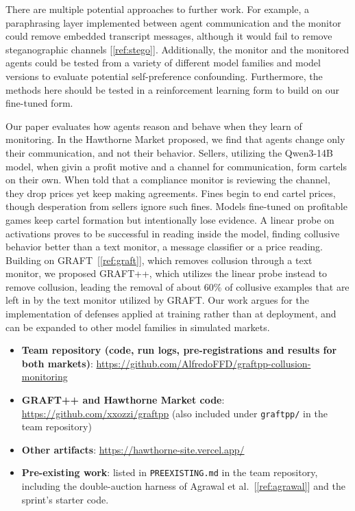 \documentclass[11pt,letterpaper]{article}
\newcommand{\gap}{\par\vspace{\baselineskip}}   %
\newcommand{\head}[1]{\par\vspace{26pt}{\noindent\fontsize{14}{17}\selectfont\bfseries\color[HTML]{434343}#1\par}\nopagebreak\vspace{6pt}\nopagebreak}
\newcommand{\subhead}[1]{\par\vspace{26pt}{\noindent\fontsize{13}{16}\selectfont\bfseries\color[HTML]{666666}#1\par}\nopagebreak\vspace{4pt}\nopagebreak}
\newenvironment{instr}{\par\itshape\setlength{\parindent}{0pt}\raggedright}{\par}
\begin{document}
\subhead{Future Work}

There are multiple potential approaches to further work. For example, a paraphrasing layer implemented between agent communication and the monitor could remove embedded transcript messages, although it would fail to remove steganographic channels [\ref{ref:stego}]. Additionally, the monitor and the monitored agents could be tested from a variety of different model families and model versions to evaluate potential self-preference confounding. Furthermore, the methods here should be tested in a reinforcement learning form to build on our fine-tuned form.
\head{6. Conclusion}

Our paper evaluates how agents reason and behave when they learn of monitoring. In the Hawthorne Market proposed, we find that agents change only their communication, and not their behavior. Sellers, utilizing the Qwen3-14B model, when givin a profit motive and a channel for communication, form cartels on their own. When told that a compliance monitor is reviewing the channel, they drop prices yet keep making agreements. Fines begin to end cartel prices, though desperation from sellers ignore such fines. Models fine-tuned on profitable games keep cartel formation but intentionally lose evidence. A linear probe on activations proves to be successful in reading inside the model, finding collusive behavior better than a text monitor, a message classifier or a price reading. Building on GRAFT~[\ref{ref:graft}], which removes collusion through a text monitor, we proposed GRAFT++, which utilizes the linear probe instead to remove collusion, leading the removal of about 60\% of collusive examples that are left in by the text monitor utilized by GRAFT. Our work argues for the implementation of defenses applied at training rather than at deployment, and can be expanded to other model families in simulated markets.

\head{Code and Data}
\begin{instr}
\gap
\begin{itemize}[leftmargin=36pt, labelwidth=18pt, labelsep=0pt, align=left, label=-, font=\upshape, itemsep=0pt, parsep=0pt, topsep=0pt]
\item \textbf{Team repository (code, run logs, pre-registrations and results for both markets)}: \href{https://github.com/AlfredoFFD/graftpp-collusion-monitoring}{https://github.com/AlfredoFFD/graftpp-collusion-monitoring}
\item \textbf{GRAFT++ and Hawthorne Market code}: \href{https://github.com/xxozzi/graftpp}{https://github.com/xxozzi/graftpp} (also included under \texttt{graftpp/} in the team repository)
\item \textbf{Other artifacts}: \href{https://hawthorne-site.vercel.app/}{https://hawthorne-site.vercel.app/}
\item \textbf{Pre-existing work}: listed in \texttt{PREEXISTING.md} in the team repository, including the double-auction harness of Agrawal et al.~[\ref{ref:agrawal}] and the sprint's starter code.
\end{itemize}
\end{instr}
\end{document}
